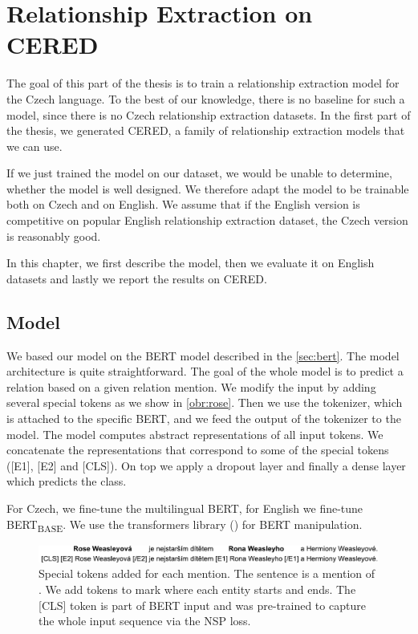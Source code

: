 \chapter{Relationship Extraction on CERED}
The goal of this part of the thesis is to train a relationship extraction model for the Czech language. To the best of our knowledge, there is no baseline for such a model, since there is no Czech relationship extraction datasets. In the first part of the thesis, we generated CERED, a family of relationship extraction models that we can use.

If we just trained the model on our dataset, we would be unable to determine, whether the model is well designed. We therefore adapt the model to be trainable both on Czech and on English. We assume that if the English version is competitive on popular English relationship extraction dataset, the Czech version is reasonably good.

In this chapter, we first describe the model, then we evaluate it on English datasets and lastly we report the results on CERED.

\section{Model}

We based our model on the BERT model described in the \autoref{sec:bert}. The model architecture is quite straightforward. The goal of the whole model is to predict a relation based on a given relation mention. We modify the input by adding several special tokens as we show in \autoref{obr:rose}. Then we use the tokenizer, which is attached to the specific BERT, and we feed the output of the tokenizer to the model. The model computes abstract representations of all input tokens. We concatenate the representations that correspond to some of the special tokens ([E1], [E2] and [CLS]). On top we apply a dropout layer and finally a dense layer which predicts the class. 

For Czech, we fine-tune the multilingual BERT, for English we fine-tune BERT\textsubscript{BASE}. We use the transformers library (\cite{Wolf2019HuggingFacesTS}) for BERT manipulation.



\begin{figure}[h]
\includegraphics[width = 1\textwidth]{./img/rose}
\caption{Special tokens added for each mention. The sentence is a mention of . We add tokens to mark where each entity starts and ends. The [CLS] token is part of BERT input and was pre-trained to capture the whole input sequence via the NSP loss.}
\label{obr:rose}
\end{figure}



